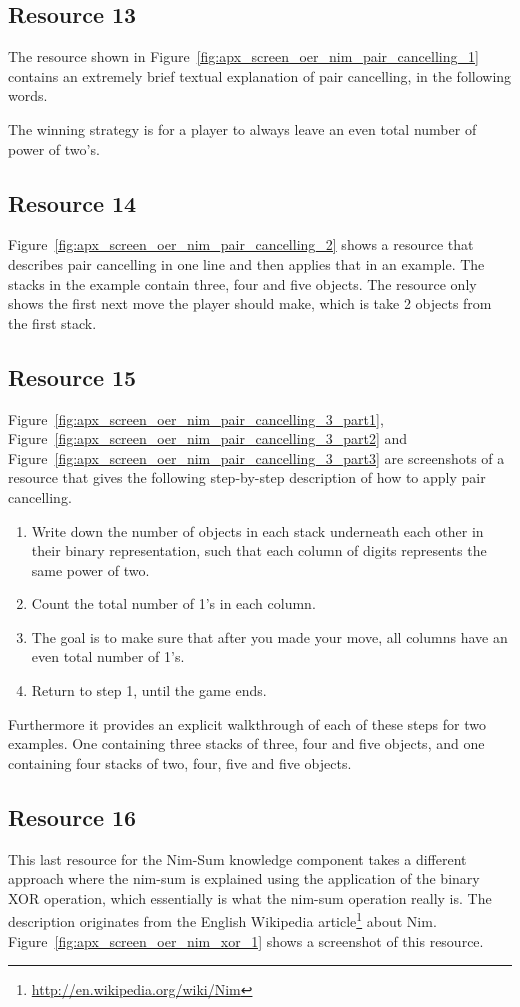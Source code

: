\subsection{Resource 13}
The resource shown in Figure~\ref{fig:apx_screen_oer_nim_pair_cancelling_1} contains an extremely brief textual explanation of pair cancelling, in the following words.
\begin{framed}
The winning strategy is for a player to always leave an even total number of
power of two's.
\end{framed}
\subsection{Resource 14}
Figure~\ref{fig:apx_screen_oer_nim_pair_cancelling_2} shows a resource that
describes pair cancelling in one line and then applies that in an example.
The stacks in the example contain three, four and five objects.
The resource only shows the first next move the player should make,
which is take 2 objects from the first stack.
\subsection{Resource 15}
Figure~\ref{fig:apx_screen_oer_nim_pair_cancelling_3_part1},
Figure~\ref{fig:apx_screen_oer_nim_pair_cancelling_3_part2} and
Figure~\ref{fig:apx_screen_oer_nim_pair_cancelling_3_part3} are screenshots of
a resource that gives the following step-by-step description of how to apply
pair cancelling.
\begin{framed}
\begin{enumerate}
	\item Write down the number of objects in each stack underneath each other
		in their binary representation, such that each column of digits
		represents the same power of two.
	\item Count the total number of 1's in each column.
	\item The goal is to make sure that after you made your move, all columns
		have an even total number of 1's.
	\item Return to step 1, until the game ends.
\end{enumerate}
\end{framed}
Furthermore it provides an explicit walkthrough of each of these steps for two
examples. One containing three stacks of three, four and five objects, and one
containing four stacks of two, four, five and five objects.
\subsection{Resource 16}
This last resource for the Nim-Sum knowledge component takes a different
approach where the nim-sum is explained using the application of the binary XOR
operation, which essentially is what the nim-sum operation really is.
The description originates from the English Wikipedia
article\footnote{\url{http://en.wikipedia.org/wiki/Nim}} about Nim.
Figure~\ref{fig:apx_screen_oer_nim_xor_1} shows a screenshot of this resource.
